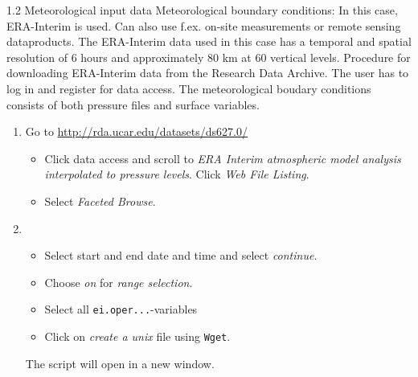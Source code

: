 \documentclass[xcolor=table]{beamer}
\begin{document}
\begin{frame}[fragile, allowframebreaks=1, t]{1.2 Meteorological input data}
Meteorological boundary conditions: In this case, ERA-Interim is used. Can also use f.ex. on-site measurements or remote sensing dataproducts. The ERA-Interim data used in this case has a temporal and spatial resolution of 6 hours and approximately 80 km at 60 vertical levels. 
Procedure for downloading ERA-Interim data from the Research Data Archive. The user has to log in and register for data access. 
The meteorological boudary conditions consists of both pressure files and surface variables. 
\begin{enumerate}
\item Go to \url{http://rda.ucar.edu/datasets/ds627.0/}
\begin{itemize}
\item Click data access and scroll to \textit{ERA Interim atmospheric model analysis interpolated to pressure levels}. Click \textit{Web File Listing}.
\item Select \textit{Faceted Browse}.
\end{itemize}
\item
\begin{itemize}
\item  Select start and end date and time and select \textit{continue}.
\item Choose \textit{on} for \textit{range selection}.
\item Select all \texttt{ei.oper...}-variables
\item Click on \textit{create a unix} file using \texttt{Wget}. 
\end{itemize}
The script will open in a new window.


\end{enumerate}
\end{frame}
\end{document}
